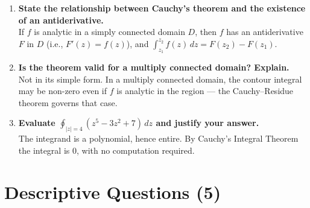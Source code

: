\documentclass[12pt,a4paper]{article}
\begin{document}
\begin{enumerate}
  \item \textbf{State the relationship between Cauchy's theorem and the existence of an antiderivative.}\\
        If $f$ is analytic in a simply connected domain $D$, then $f$ has an antiderivative $F$
        in $D$ (i.e., $F'(z)=f(z)$), and $\int_{z_1}^{z_2}f(z)\,dz = F(z_2)-F(z_1)$.

  \item \textbf{Is the theorem valid for a multiply connected domain? Explain.}\\
        Not in its simple form.
        In a multiply connected domain, the contour integral may be non-zero
        even if $f$ is analytic in the region --- the Cauchy--Residue theorem governs that case.

  \item \textbf{Evaluate $\oint_{|z|=4}(z^5 - 3z^2 + 7)\,dz$ and justify your answer.}\\
        The integrand is a polynomial, hence entire.
        By Cauchy's Integral Theorem the integral is $0$, with no computation required.
\end{enumerate}

\section{Descriptive Questions (5)}
\end{document}
